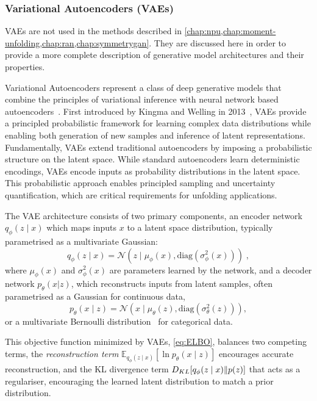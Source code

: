     \subsubsection{Variational Autoencoders (VAEs)}
    \begin{note*}
        VAEs are not used in the methods described in \cref{chap:npu,chap:moment-unfolding,chap:ran,chap:symmetrygan}. They are discussed here in order to provide a more complete description of generative model architectures and their properties.
    \end{note*}
        Variational Autoencoders represent a class of deep generative models that combine the principles of variational inference with neural network based autoencoders~\cite{Bank2023Autoencoders}.
        First introduced by Kingma and Welling in 2013~\cite{Kingma2013Auto-EncodingBayes}, VAEs provide a principled probabilistic framework for learning complex data distributions while enabling both generation of new samples and inference of latent representations.
        Fundamentally, VAEs extend traditional autoencoders by imposing a probabilistic structure on the latent space.
        While standard autoencoders learn deterministic encodings, VAEs encode inputs as probability distributions in the latent space.
        This probabilistic approach enables principled sampling and uncertainty quantification, which are critical requirements for unfolding applications.

        The VAE architecture consists of two primary components, an encoder network \(q_{\phi}(z\mid x)\) which maps inputs \(x\) to a latent space distribution, typically parametrised as a multivariate Gaussian:
        \begin{equation}
        q_{\phi}(z \mid x) = \mathcal{N}(z \mid \mu_{\phi}(x), \text{diag}(\sigma^2_{\phi}(x)))\;,
        \end{equation}
        where \(\mu_{\phi}(x)\) and \(\sigma^2_{\phi}(x)\) are parameters learned by the network, and a  decoder network \(p_{\theta}(x|z)\), which reconstructs inputs from latent samples, often parametrised as a Gaussian for continuous data,
        \begin{equation}
            p_{\theta}(x\mid z) = \mathcal{N}(x\mid \mu_{\theta}(z), \text{diag}(\sigma^2_{\theta}(z))),
        \end{equation}
        or a multivariate Bernoulli distribution~\cite{Fajtl2020LatentAutoencoder} for categorical data.

        This objective function minimized by VAEs, \cref{eq:ELBO}, balances two competing terms, the \emph{reconstruction term} \(\mathbb{E}_{q_{\phi}(z\mid x)}[\ln p_{\theta}(x\mid z)]\) encourages accurate reconstruction, and the KL divergence term \(D_{KL}\qty[q_{\phi}(z\mid x) \| p(z)]\) that acts as a regulariser, encouraging the learned latent distribution to match a prior distribution.
        
